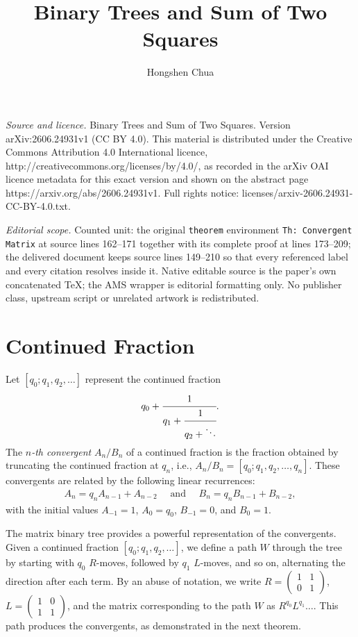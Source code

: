 \documentclass[10pt,a4paper]{amsart}
\begin{document}
\title[Binary Trees and Sum of Two Squares]{Binary Trees and Sum of Two Squares}
\author{Hongshen Chua}
\date{}
\maketitle
\noindent\emph{Source and licence.} Binary Trees and Sum of Two Squares. Version arXiv:2606.24931v1 (CC BY 4.0). This material is distributed under the Creative Commons Attribution 4.0 International licence, http://creativecommons.org/licenses/by/4.0/, as recorded in the arXiv OAI licence metadata for this exact version and shown on the abstract page https://arxiv.org/abs/2606.24931v1. Full rights notice: licenses/arxiv-2606.24931-CC-BY-4.0.txt.\par\smallskip
\noindent\textit{Editorial scope.} Counted unit: the original \texttt{theorem} environment \texttt{Th: Convergent Matrix} at source lines 162--171 together with its complete proof at lines 173--209; the delivered document keeps source lines 149--210 so that every referenced label and every citation resolves inside it. Native editable source is the paper's own concatenated TeX; the AMS wrapper is editorial formatting only. No publisher class, upstream script or unrelated artwork is redistributed.
\section{Continued Fraction} \label{Ch: Continued Fraction}

Let $ [q_0; q_1, q_2, \ldots] $ represent the continued fraction
\begin{align*}
	q_0 + \cfrac{1}{q_1 + \cfrac{1}{q_2 + \ddots}}.
\end{align*}
The \textit{$ n $-th convergent} $ A_n/B_n $ of a continued fraction is the fraction obtained by truncating the continued fraction at $ q_n $, i.e., $ A_n/B_n = [q_0; q_1, q_2, \ldots, q_n] $. These convergents are related by the following linear recurrences:
\begin{align*}
	A_n = q_n A_{n - 1} + A_{n - 2} \quad \text{ and } \quad B_n = q_n B_{n - 1} + B_{n - 2},
\end{align*}
with the initial values $ A_{-1} = 1 $, $ A_0 = q_0 $, $ B_{-1} = 0 $, and $ B_0 = 1 $.

The matrix binary tree provides a powerful representation of the convergents. Given a continued fraction $ [q_0; q_1, q_2, \ldots] $, we define a path $ W $ through the tree by starting with $ q_0 $ $ R $-moves, followed by $ q_1 $ $ L $-moves, and so on, alternating the direction after each term. By an abuse of notation, we write $ R = \begin{pmatrix} 1 & 1 \\ 0 & 1 \end{pmatrix} $, $ L = \begin{pmatrix} 1 & 0 \\ 1 & 1 \end{pmatrix} $, and the matrix corresponding to the path $ W $ as $ R^{q_0} L^{q_1} \ldots $. This path produces the convergents, as demonstrated in the next theorem.
\end{document}
